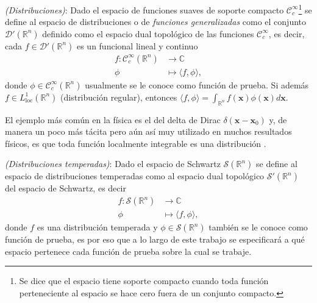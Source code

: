         \begin{definition*}
            \textit{(Distribuciones)}: Dado el espacio de funciones suaves de soporte compacto $\mathcal{C}^\infty_c$\footnote{Se dice que el espacio tiene soporte compacto cuando toda función perteneciente al espacio se hace cero fuera de un conjunto compacto.} se define al espacio de distribuciones o de \textit{funciones generalizadas} como el conjunto $\mathcal{D}'(\mathbb{R}^n)$ definido como el espacio dual topológico de las funciones $\mathcal{C}^\infty_c$, es decir, cada $f \in \mathcal{D}'(\mathbb{R}^n)$ es un funcional lineal y continuo
            \begin{equation}
                \begin{split}
                    f : \mathcal{C}_c^\infty(\mathbb{R}^n) & \longrightarrow \mathbb{C}\\
                     \phi & \longmapsto \langle f,\phi \rangle,
                \end{split}
            \end{equation}
            donde $\phi \in \mathcal{C}_c^\infty (\mathbb{R}^n)$ usualmente se le conoce como función de prueba. Si además $f \in L^1_{\mathrm{loc}}(\mathbb{R}^n)$ (distribución regular), entonces $\langle f,\phi\rangle = \int_{\mathbb{R}^n} f(\mathbf{x})\phi(\mathbf{x})d\mathbf{x}$.
        \end{definition*}

        El ejemplo más común en la física es el del delta de Dirac $\delta(\mathbf{x}-\mathbf{x}_0)$ y, de manera un poco más tácita pero aún así muy utilizado en muchos resultados físicos, es que toda función localmente integrable es una distribución \citep{grafakos2014classical,rudin1991functional}.

        \begin{definition*}
            \textit{(Distribuciones temperadas)}: Dado el espacio de Schwartz $\mathcal{S}(\mathbb{R}^n)$ se define al espacio de distribuciones temperadas como al espacio dual topológico $\mathcal{S}'(\mathbb{R}^n)$ del espacio de Schwartz, es decir
            \begin{equation}
                \begin{split}
                    f: \mathcal{S}(\mathbb{R}^n) & \longrightarrow \mathbb{C}\\
                     \phi & \longmapsto \langle f,\phi \rangle,
                \end{split}
            \end{equation}
            donde $f$ es una distribución temperada y $\phi \in \mathcal{S} (\mathbb{R}^n)$ también se le conoce como función de prueba, es por eso que a lo largo de este trabajo se especificará a qué espacio pertenece cada función de prueba sobre la cual se trabaje.
        \end{definition*}

